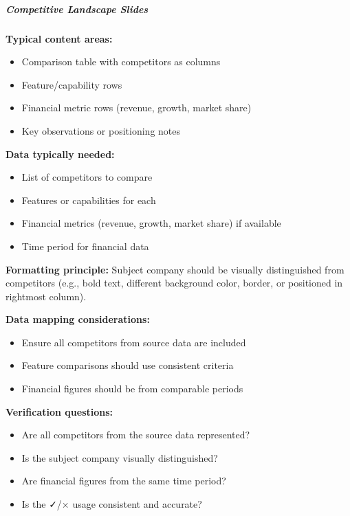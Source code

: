 \documentclass[11pt]{article}
\begin{document}
\subparagraph{Competitive Landscape Slides}\mbox{}\par

\textbf{Typical content areas:}

\begin{itemize}[leftmargin=*,itemsep=2pt,topsep=2pt]
\item {} Comparison table with competitors as columns
\item {} Feature/capability rows
\item {} Financial metric rows (revenue, growth, market share)
\item {} Key observations or positioning notes
\end{itemize}

\textbf{Data typically needed:}

\begin{itemize}[leftmargin=*,itemsep=2pt,topsep=2pt]
\item {} List of competitors to compare
\item {} Features or capabilities for each
\item {} Financial metrics (revenue, growth, market share) if available
\item {} Time period for financial data
\end{itemize}

\textbf{Formatting principle:} Subject company should be visually distinguished from competitors (e.g., bold text, different background color, border, or positioned in rightmost column).


\textbf{Data mapping considerations:}

\begin{itemize}[leftmargin=*,itemsep=2pt,topsep=2pt]
\item {} Ensure all competitors from source data are included
\item {} Feature comparisons should use consistent criteria
\item {} Financial figures should be from comparable periods
\end{itemize}

\textbf{Verification questions:}

\begin{itemize}[leftmargin=*,itemsep=2pt,topsep=2pt]
\item {} Are all competitors from the source data represented?
\item {} Is the subject company visually distinguished?
\item {} Are financial figures from the same time period?
\item {} Is the ✓/× usage consistent and accurate?
\end{itemize}
\end{document}
